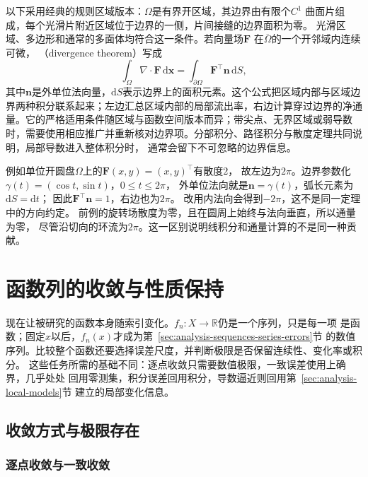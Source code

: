 以下采用经典的规则区域版本：$\Omega$是有界开区域，其边界由有限个$C^1$
曲面片组成，每个光滑片附近区域位于边界的一侧，片间接缝的边界面积为零。
光滑区域、多边形和通常的多面体均符合这一条件。若向量场$\bm{F}$
在$\overline{\Omega}$的一个开邻域内连续可微，
（divergence theorem）写成
\begin{equation}
  \int_{\Omega}\nabla\mathbin{\cdot}\bm{F}\,\mathrm{d}\bm{x}
  =
  \int_{\partial\Omega}\bm{F}^{\top}\bm{n}\,\mathrm{d}S,
\label{eq:analysis-divergence-theorem}
\end{equation}
其中$\bm{n}$是外单位法向量，$\mathrm dS$表示边界上的面积元素。这个公式把区域内部与区域边界两种积分联系起来；左边汇总区域内部的局部流出率，右边计算穿过边界的净通量。它的严格适用条件随区域与函数空间版本而异；带尖点、无界区域或弱导数时，需要使用相应推广并重新核对边界项。分部积分、路径积分与散度定理共同说明，局部导数进入整体积分时， 通常会留下不可忽略的边界信息。

例如单位开圆盘$\Omega$上的$\bm F(x,y)=(x,y)^\top$有散度$2$，
故左边为$2\pi$。边界参数化$\gamma(t)=(\cos t,\sin t)$，$0\leq t\leq2\pi$，
外单位法向就是$\bm n=\gamma(t)$，弧长元素为$\mathrm dS=\mathrm dt$；
因此$\bm F^\top\bm n=1$，右边也为$2\pi$。
改用内法向会得到$-2\pi$，这不是同一定理中的方向约定。
前例的旋转场散度为零，且在圆周上始终与法向垂直，所以通量为零，
尽管沿切向的环流为$2\pi$。这一区别说明线积分和通量计算的不是同一种贡献。

\section{函数列的收敛与性质保持}
\label{sec:analysis-function-convergence-essential-bounds}

现在让被研究的函数本身随索引变化。$f_n:X\to\mathbb R$仍是一个序列，只是每一项
是函数；固定$x$以后，$f_n(x)$才成为第~\ref{sec:analysis-sequences-series-errors}节
的数值序列。比较整个函数还要选择误差尺度，并判断极限是否保留连续性、变化率或积分。
这些任务所需的基础不同：逐点收敛只需要数值极限，一致误差使用上确界，几乎处处
回用零测集，积分误差回用积分，导数逼近则回用第~\ref{sec:analysis-local-models}节
建立的局部变化信息。

\subsection{收敛方式与极限存在}
\subsubsection{逐点收敛与一致收敛}

